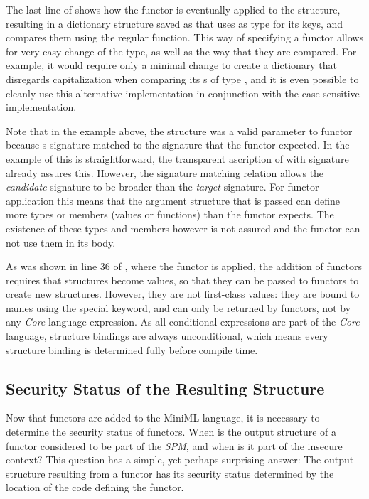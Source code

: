 The last line of  shows how the functor  is eventually applied to the  structure, resulting in a dictionary structure saved as  that uses  as type for its keys, and compares them using the regular  function.
This way of specifying a functor allows for very easy change of the  type, as well as the way that they are compared.
For example, it would require only a minimal change to create a dictionary that disregards capitalization when comparing its s of type , and it is even possible to cleanly use this alternative implementation in conjunction with the case-sensitive implementation.

\smallskip

\noindent Note that in the example above, the structure  was a valid parameter to functor  because s signature matched to the  signature that the functor expected. In the example of  this is straightforward, the transparent ascription of  with signature  already assures this.
However, the signature matching relation allows the \emph{candidate} signature to be broader than the \emph{target} signature.
For functor application this means that the argument structure that is passed can define more types or members (values or functions) than the functor expects.
The existence of these types and members however is not assured and the functor can not use them in its body. 

\smallskip

As was shown in line 36 of , where the  functor is applied, the addition of functors requires that structures become values, so that they can be passed to functors to create new structures.
However, they are not first-class values: they are bound to names using the special  keyword, and can only be returned by functors, not by any \emph{Core} language expression.
As all conditional expressions are part of the \emph{Core} language, structure bindings are always unconditional, which means every structure binding is determined fully before compile time.

\subsection{Security Status of the Resulting Structure}
\label{sec:FunctorSecurityStatus}
Now that functors are added to the MiniML language, it is necessary to determine the security status of functors. 
When is the output structure of a functor considered to be part of the \emph{SPM}, and when is it part of the insecure context?
This question has a simple, yet perhaps surprising answer:
The output structure resulting from a functor has its security status determined by the location of the code defining the functor.

